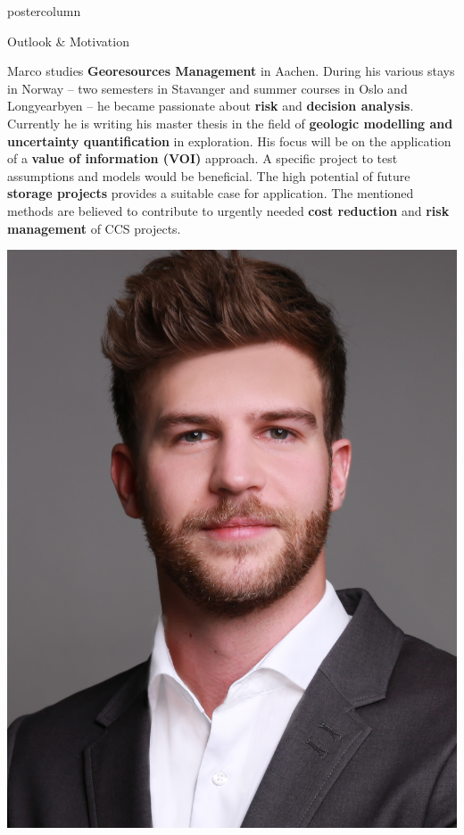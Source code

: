 \documentclass{beamer}
\begin{document}
\begin{frame}
\begin{columns}
\begin{column}{.618\textwidth}
\begin{beamercolorbox}[center]{postercolumn}
\begin{minipage}{.98\textwidth}
{					
\begin{myblock}{Outlook \& Motivation}
		\begin{minipage}[t]{0.72\textwidth}
			\vspace{0pt}
			Marco studies \textbf{Georesources Management} in Aachen. During his various stays in Norway -- two semesters in Stavanger and summer courses in Oslo and Longyearbyen -- he became passionate about \textbf{risk} and \textbf{decision analysis}. Currently he is writing his master thesis in the field of\textbf{ geologic modelling and uncertainty quantification} in exploration. His focus will be on the application of a \textbf{value of information (VOI)} approach. A specific project to test assumptions and models would be beneficial. The high potential of future \textbf{ storage projects} provides a suitable case for application. The mentioned methods are believed to contribute to urgently needed \textbf{cost reduction} and \textbf{risk management} of CCS projects.
		\end{minipage}\hfill
		\begin{minipage}[t]{0.23\textwidth}
			\vspace{0em}
			\includegraphics[width=1\textwidth]{figures/author}
			\vspace{0.5em}
		\end{minipage}
		

\end{myblock}}
\end{minipage}
\end{beamercolorbox}
\end{column}
\end{columns}
\end{frame}
\end{document}
